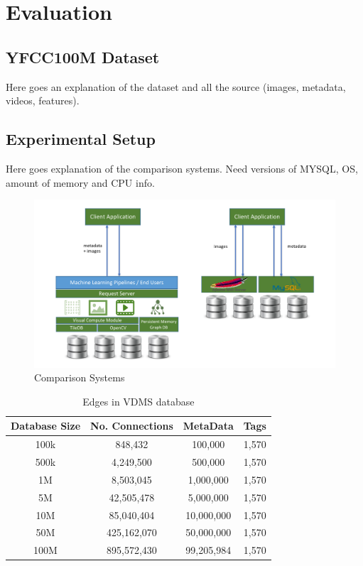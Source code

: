\section{Evaluation}
\label{eval}

\subsection{YFCC100M Dataset}
\label{dataset}

Here goes an explanation of the dataset and all the source
(images, metadata, videos, features).

\subsection{Experimental Setup}

Here goes explanation of the comparison systems.
Need versions of MYSQL, OS, amount of memory and CPU info.

\begin{figure}[]
\centering
\includegraphics[width=\textwidth]{figures/comparison_system}
\caption{Comparison Systems}
\label{fig:systems}
\end{figure}

\begin{table}[h]
\caption{Edges in VDMS database}
\centering
\begin{tabular}{c c c c}
\hline\hline
Database Size & No. Connections & MetaData & Tags\\
\hline
100k & 848,432 & 100,000 & 1,570\\
500k & 4,249,500 & 500,000 & 1,570\\
1M & 8,503,045 & 1,000,000 & 1,570\\
5M & 42,505,478 & 5,000,000 & 1,570\\
10M & 85,040,404 & 10,000,000 & 1,570\\
50M & 425,162,070 & 50,000,000 & 1,570\\
100M & 895,572,430 & 99,205,984 & 1,570\\
\hline
\end{tabular}
\label{table:vdmsedges}
\end{table}

